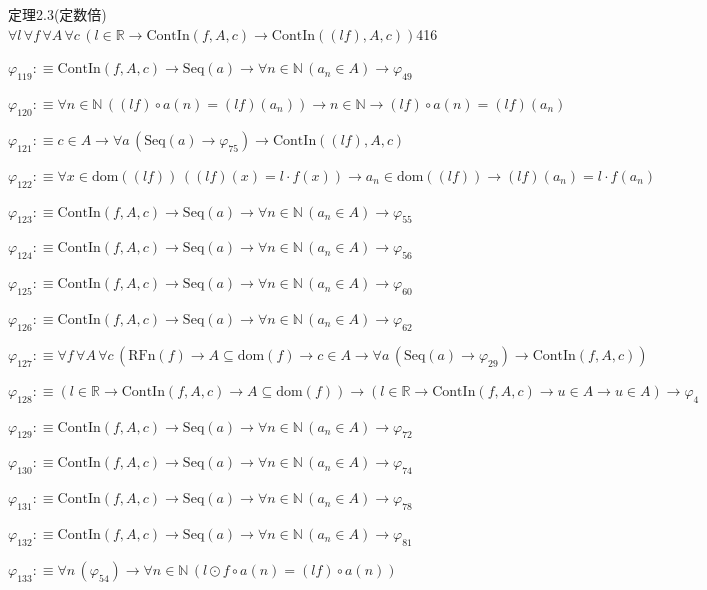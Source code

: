 \begin{fullproof}{定理2.3(定数倍)}{$\forall l\,\forall f\,\forall A\,\forall c\,(l \in \mathbb{R} \to \mathrm{ContIn}(f,A,c) \to \mathrm{ContIn}((l f),A,c))$}{416}
\begin{abbrevlist}
\item $\varphi_{119} :\equiv \mathrm{ContIn}(f,A,c) \to \mathrm{Seq}(a) \to \forall n \in \mathbb{N}\,(a_{n} \in A) \to \varphi_{49}$
\item $\varphi_{120} :\equiv \forall n \in \mathbb{N}\,((l f) \circ a(n) = (l f)(a_{n})) \to n \in \mathbb{N} \to (l f) \circ a(n) = (l f)(a_{n})$
\item $\varphi_{121} :\equiv c \in A \to \forall a\,(\mathrm{Seq}(a) \to \varphi_{75}) \to \mathrm{ContIn}((l f),A,c)$
\item $\varphi_{122} :\equiv \forall x \in \mathrm{dom}((l f))\,((l f)(x) = l \cdot f(x)) \to a_{n} \in \mathrm{dom}((l f)) \to (l f)(a_{n}) = l \cdot f(a_{n})$
\item $\varphi_{123} :\equiv \mathrm{ContIn}(f,A,c) \to \mathrm{Seq}(a) \to \forall n \in \mathbb{N}\,(a_{n} \in A) \to \varphi_{55}$
\item $\varphi_{124} :\equiv \mathrm{ContIn}(f,A,c) \to \mathrm{Seq}(a) \to \forall n \in \mathbb{N}\,(a_{n} \in A) \to \varphi_{56}$
\item $\varphi_{125} :\equiv \mathrm{ContIn}(f,A,c) \to \mathrm{Seq}(a) \to \forall n \in \mathbb{N}\,(a_{n} \in A) \to \varphi_{60}$
\item $\varphi_{126} :\equiv \mathrm{ContIn}(f,A,c) \to \mathrm{Seq}(a) \to \forall n \in \mathbb{N}\,(a_{n} \in A) \to \varphi_{62}$
\item $\varphi_{127} :\equiv \forall f\,\forall A\,\forall c\,(\mathrm{RFn}(f) \to A \subseteq \mathrm{dom}(f) \to c \in A \to \forall a\,(\mathrm{Seq}(a) \to \varphi_{29}) \to \mathrm{ContIn}(f,A,c))$
\item $\varphi_{128} :\equiv (l \in \mathbb{R} \to \mathrm{ContIn}(f,A,c) \to A \subseteq \mathrm{dom}(f)) \to (l \in \mathbb{R} \to \mathrm{ContIn}(f,A,c) \to u \in A \to u \in A) \to \varphi_{4}$
\item $\varphi_{129} :\equiv \mathrm{ContIn}(f,A,c) \to \mathrm{Seq}(a) \to \forall n \in \mathbb{N}\,(a_{n} \in A) \to \varphi_{72}$
\item $\varphi_{130} :\equiv \mathrm{ContIn}(f,A,c) \to \mathrm{Seq}(a) \to \forall n \in \mathbb{N}\,(a_{n} \in A) \to \varphi_{74}$
\item $\varphi_{131} :\equiv \mathrm{ContIn}(f,A,c) \to \mathrm{Seq}(a) \to \forall n \in \mathbb{N}\,(a_{n} \in A) \to \varphi_{78}$
\item $\varphi_{132} :\equiv \mathrm{ContIn}(f,A,c) \to \mathrm{Seq}(a) \to \forall n \in \mathbb{N}\,(a_{n} \in A) \to \varphi_{81}$
\item $\varphi_{133} :\equiv \forall n\,(\varphi_{54}) \to \forall n \in \mathbb{N}\,(l \odot f \circ a(n) = (l f) \circ a(n))$

\end{abbrevlist}
\end{fullproof}
